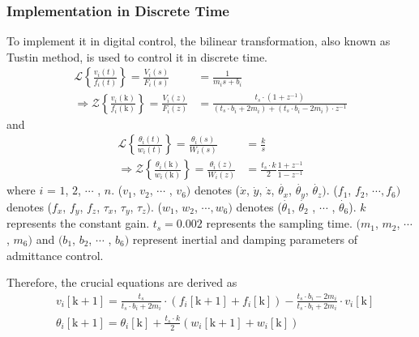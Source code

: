 \subsubsection{Implementation in Discrete Time}
\hspace*{6mm}To implement it in digital control, the bilinear transformation, also known as Tustin method, is used to control it in discrete time.
\begin{equation}
\label{eq:z_domain eq}
\begin{split}
\mathcal{L}\left\lbrace \frac{v_i(t)}{f_i(t)} \right\rbrace = \frac{V_i(s)}{F_i(s)} &= \frac{1}{m_is+b_i}\\
\Rightarrow 
\mathcal{Z}\left\lbrace \frac{v_i(\mathrm{k})}{f_i(\mathrm{k})} \right\rbrace = \frac{V_i(z)}{F_i(z)} &= \frac{t_s \cdot (1+z^{-1})}{(t_s \cdot b_i+2m_i)+(t_s \cdot b_i-2m_i)\cdot z^{-1}}
\end{split}
\end{equation}
and
\begin{equation}
\begin{split}
\mathcal{L}\left\lbrace \frac{\theta_i(t)}{w_i(t)} \right\rbrace = \frac{\theta_i(s)}{W_i(s)} 	&= \frac{k}{s}\\
\Rightarrow 
\mathcal{Z}\left\lbrace \frac{\theta_i(\mathrm{k})}{w_i(\mathrm{k})} \right\rbrace = \frac{\theta_i(z)}{W_i(z)}	&= \frac{t_s \cdot k}{2}	
				\frac{1+z^{-1}}{1-z^{-1}}
\end{split}
\end{equation}
where $i$ = $1$, $2$, $\cdots$ , $n$. ($v_1$, $v_2$, $\cdots$ , $v_6)$ denotes ($\dot{x}$, $\dot{y}$, $\dot{z}$, $\dot{\theta _x}$, $\dot{\theta _y}$, $\dot{\theta _z})$. ($f_1$, $f_2$, $\cdots , f_6)$ denotes ($f_x$, $f_y$, $f_z$, $\tau _x$, $\tau _y$, $\tau _z )$. ($w_1$, $w_2$, $\cdots , w_6)$ denotes ($\dot{\theta _1}$, $\dot{\theta _2}$ , $\cdots$ , $\dot{\theta _6}$). $k$ represents the constant gain. $t_s = 0.002$ represents the sampling time. $(m_1$, $m_2$, $\cdots$ , $m_6)$ and $(b_1$, $b_2$, $\cdots$ , $b_6)$ represent inertial and damping parameters of admittance control.
\par\noindent
Therefore, the crucial equations are derived as 
\begin{equation}
\begin{split}
&v_i[\mathrm{k}+1] = \frac{t_s}{t_s \cdot b_i+2m_i}
							\cdot \left(	f_i[\mathrm{k}+1] + f_i[\mathrm{k}]		\right)
						 - \frac{t_s \cdot b_i-2m_i}{t_s \cdot b_i+2m_i}
						 	\cdot v_i[\mathrm{k}]												\\
&\theta_i[\mathrm{k}+1] = \theta_i[\mathrm{k}] + \frac{t_s \cdot k}{2}
												\left( w_i[\mathrm{k}+1] + w_i[\mathrm{k}] \right)
\end{split}
\end{equation}	
